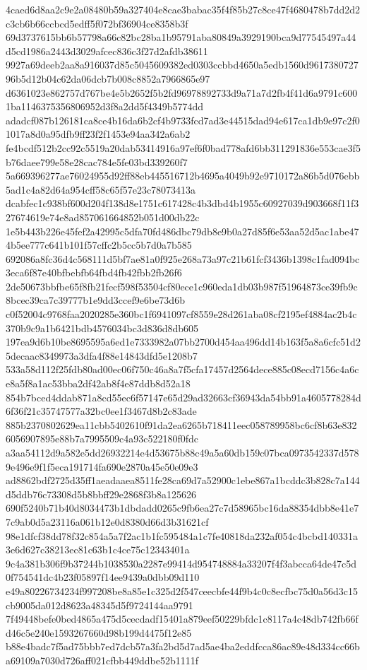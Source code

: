 \documentclass[11pt,a4paper]{article}
\begin{document}
{4caed6d8aa2c9e2a08480b59a327404e8cae3babac35f4f85b27c8ce47f4680478b7dd2d2c3cb6b66ccbcd5edff5f072bf36904ce8358b3f
69d3737615bb6b57798a66c82bc28ba1b95791aba80849a3929190bca9d77545497a44d5cd1986a2443d3029afcec836c3f27d2afdb38611
9927a69deeb2aa8a916037d85c5045609382ed0303ccbbd4650a5edb1560d961738072796b5d12b04c62da06dcb7b008c8852a7966865e97
d6361023e862757d767be4e5b2652f5b2fd96978892733d9a71a7d2fb4f41d6a9791c6001ba1146375356806952d3f8a2dd5f4349b5774dd
adadcf087b126181ca8ce4b16da6b2cf4b9733fcd7ad3e44515dad94e617ca1db9e97c2f01017a8d0a95dfb9ff23f2f1453e94aa342a6ab2
fe4bcdf512b2cc92c5519a20dab53414916a97ef6f0bad778afd6bb311291836e553cae3f5b76daee799e58e28cac784e5fe03bd339260f7
5a669396277ae76024955d92ff88eb445516712b4695a4049b92e9710172a86b5d076ebb5ad1c4a82d64a954cff58c65f57e23c78073413a
dcabfec1c938bf600d204f138d8e1751c617428c4b3dbd4b1955c60927039d903668f11f327674619e74e8ad857061664852b051d00db22c
1e5b443b226e45fef2a42995c5dfa70fd486dbc79db8e9b0a27d85f6e53aa52d5ac1abe474b5ee777c641b101f57cffc2b5cc5b7d0a7b585
692086a8fc36d4c568111d5bf7ae81a0f925e268a73a97c21b61fcf3436b1398c1fad094bc3eca6f87e40bfbebfb64fbd4fb42fbb2fb26f6
2de50673bbfbe65f8fb21fecf598f53504cf80ece1c960eda1db03b987f51964873ce39fb9c8bcec39ca7c39777b1e9dd3ccef9e6be73d6b
c0f52004c9768faa2020285e360bc1f6941097cf8559e28d261aba08cf2195ef4884ac2b4c370b9c9a1b6421bdb4576034bc3d836d8db605
197ea9d6b10be8695595a6ed1e7333982a07bb2700d454aa496dd14b163f5a8a6cfc51d25decaac8349973a3dfa4f88e14843dfd5e1208b7
533a58d112f25fdb80ad00ec06f750c46a8a7f5cfa17457d2564dece885c08ecd7156c4a6ce8a5f8a1ac53bba2df42ab8f4e87ddb8d52a18
854b7bced4ddab871a8cd55ec6f57147e65d29ad32663cf36943da54bb91a4605778284d6f36f21c35747577a32bc0ee1f3467d8b2c83ade
885b2370802629ea11cbb5402610f91da2ea6265b718411eec058789958bc6cf8b63e8326056907895e88b7a7995509c4a93c522180f0fdc
a3aa54112d9a582e5dd26932214e4d53675b88c49a5a60db159c07bca0973542337d5789e496e9f1f5eca191714fa690e2870a45e50e09e3
ad8862bdf2725d35ff1aeadaaea8511fe28ca69d7a52900c1ebe867a1bcddc3b828c7a144d5ddb76c73308d5b8bbff29e2868f3b8a125626
690f5240b71b40d8034473b1dbdadd0265c9fb6ea27c7d58965bc16da88354dbb8e41e77c9ab0d5a23116a061b12e0d8380d66d3b31621cf
98e1dfcf38dd78f32c854a5a7f2ac1b1fc595484a1c7fe40818da232af054c4bcbd140331a3e6d627c38213ec81c63b1c4ce75c12343401a
9c4a381b306f9b37244b1038530a2287e99414d954748884a33207f4f3abcca64de47c5d0f754541dc4b23f05897f14ee9439a0dbb09d110
e49a80226734234f997208be8a85e1c325d2f547ceecbfe44f9b4c0c8ecfbc75d0a56d3c15cb9005da012d8623a48345d5f9724144aa9791
7f49448befe0bed4865a475d5cecdadf15401a879eef50229bfdc1c8117a4c48db742fb66fd46c5e240e1593267660d98b199d4475f12e85
b88e4badc7f5ad75bbb7ed7dcb57a3fa2bd5d7ad5ae4ba2eddfcca86ac89e48d334cc66ba69109a7030d726aff021cfbb449ddbe52b1111f
}
\end{document}
